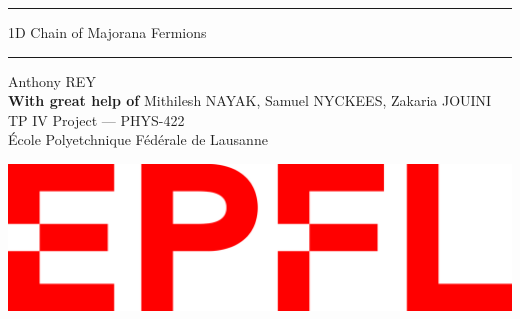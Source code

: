 \documentclass[11pt, fleqn]{article}
\begin{document}
\titleformat{\section}{\centering\Huge\bfseries\sffamily\color{RedViolet}}{}{0em}{\MakeUppercase}{}
\titleformat{\subsection}{\Large\bfseries\sffamily\color{RedViolet}}{\hspace{0.5cm}{\color{gray}\textbar}\hspace{0.2cm}}{0em}{}{}

\begin{titlepage}
    \begin{center}    

        \mbox{}    
        \vspace{2cm}
        \begin{center}
            \rule{8cm}{1pt}
        \end{center}
        \vspace{1cm}
        {\Huge\sffamily\color{RedViolet} 1D Chain of Majorana Fermions}
        \vspace{0.7cm}
        \begin{center}
            \rule{8cm}{1pt}
        \end{center}
        \vspace{5 cm}
        
        {\Large\sffamily Anthony REY}\\        
        \vspace{0.5cm}
        {\large\sffamily\textbf{With great help of} Mithilesh NAYAK, Samuel NYCKEES, Zakaria JOUINI}\\

        \vspace{6cm}
        {\sffamily TP IV Project --- PHYS-422}\\
        {\sffamily \'Ecole Polyetchnique Fédérale de Lausanne}

        \vfill
        \includegraphics[scale=0.03]{../images/logo.png}
        
    \end{center}
\end{titlepage}

\tableofcontents







\printbibliography
\end{document}

